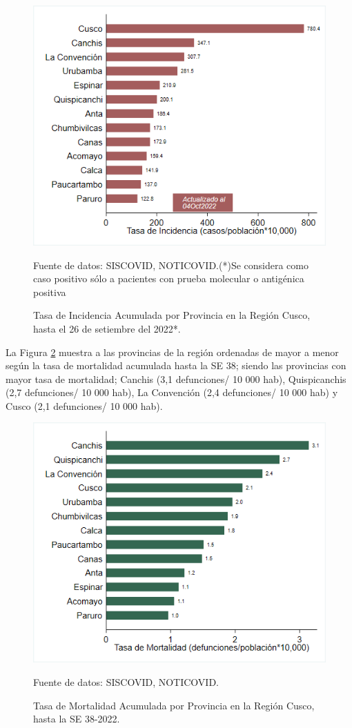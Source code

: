 \documentclass[12pt,a4paper,openany]{book}
\begin{document}
	\begin{figure}[!htpb]
		\caption{Tasa de Incidencia Acumulada por Provincia en la Región Cusco, hasta el 26 de setiembre del 2022*. }\label{fig:incidencia_provincias}
		\begin{center}
			\includegraphics[width=0.60\linewidth]{../figuras/incidencia_provincial_2022.png}
		\end{center}
		{\footnotesize {
				Fuente de datos: SISCOVID, NOTICOVID.(*)Se considera como caso positivo sólo a pacientes con prueba molecular o antigénica positiva}}
	\end{figure}
	
	La Figura \ref{fig:mortalidad_ordenada} muestra a las provincias de la región ordenadas de mayor a menor según la tasa de mortalidad acumulada hasta la SE 38; siendo las provincias con mayor tasa de mortalidad;  Canchis (3,1 defunciones/ 10 000 hab), Quispicanchis (2,7 defunciones/ 10 000 hab), La Convención (2,4 defunciones/ 10 000 hab) y Cusco (2,1 defunciones/ 10 000 hab).
	
	\begin{figure}[h]
		\caption{Tasa de Mortalidad Acumulada por Provincia en la Región Cusco, hasta la SE 38-2022. }\label{fig:mortalidad_ordenada}
		\begin{center}
			\includegraphics[width=0.60\linewidth]{../figuras/mortalidad_provincial_2022.png}
		\end{center}
		{\footnotesize {Fuente de datos: SISCOVID, NOTICOVID.}}
	\end{figure}
	
\end{document}

